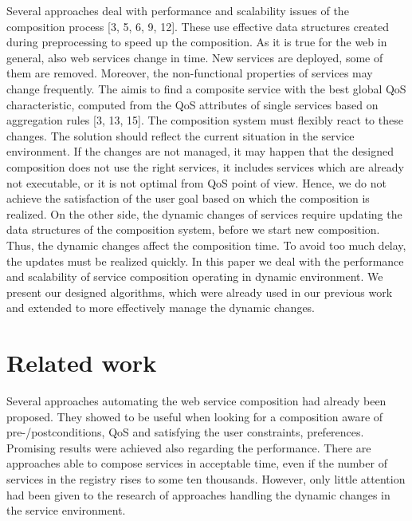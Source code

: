 \documentclass[11pt]{llncs}
\begin{document}
Several approaches deal with performance and scalability issues of the composition
process [3, 5, 6, 9, 12]. These use effective data structures created during
preprocessing to speed up the composition. As it is true for the web in general, also
web services change in time. New services are deployed, some of them are removed.
Moreover, the non-functional properties of services may change frequently. 
The aimis to find a composite service with the best global QoS characteristic, computed
from the QoS attributes of single services based on aggregation rules [3, 13, 15].
The composition system must flexibly react to these changes. The solution should
reflect the current situation in the service environment. If the changes are not managed,
it may happen that the designed composition does not use the right services,
it includes services which are already not executable, or it is not optimal from QoS
point of view. Hence, we do not achieve the satisfaction of the user goal based on
which the composition is realized. On the other side, the dynamic changes of services
require updating the data structures of the composition system, before we start
new composition. Thus, the dynamic changes affect the composition time. To avoid
too much delay, the updates must be realized quickly. In this paper we deal with the
performance and scalability of service composition operating in dynamic environment.
We present our designed algorithms, which were already used in our previous
work and extended to more effectively manage the dynamic changes.

\section{Related work}

Several approaches automating the web service composition had already been proposed.
They showed to be useful when looking for a composition aware of pre-/postconditions,
QoS and satisfying the user constraints, preferences. Promising results
were achieved also regarding the performance. There are approaches able to compose
services in acceptable time, even if the number of services in the registry rises
to some ten thousands. However, only little attention had been given to the research
of approaches handling the dynamic changes in the service environment.
\end{document}
